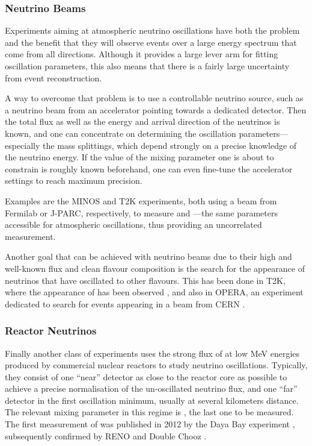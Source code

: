 \subsubsection{Neutrino Beams}

Experiments aiming at atmospheric neutrino oscillations have both the problem
and the benefit that they will observe events over a large energy spectrum that
come from all directions. Although it provides a large lever arm for fitting
oscillation parameters, this also means that there is a fairly large uncertainty
from event reconstruction.

A way to overcome that problem is to use a controllable neutrino source, such as
a neutrino beam from an accelerator pointing towards a dedicated detector. Then
the total flux as well as the energy and arrival direction of the neutrinos is
known, and one can concentrate on determining the oscillation
parameters---especially the mass splittings, which depend strongly on a precise
knowledge of the neutrino energy. If the value of the mixing parameter one is
about to constrain is roughly known beforehand, one can even fine-tune the
accelerator settings to reach maximum precision.

Examples are the MINOS \cite{MINOSparams} and T2K \cite{T2Kparams} experiments,
both using a \numu beam from Fermilab or J-PARC, respectively, to measure
 and ---the same parameters accessible for atmospheric
oscillations, thus providing an uncorrelated measurement.

Another goal that can be achieved with neutrino beams due to their high and
well-known flux and clean flavour composition is the search for the appearance
of neutrinos that have oscillated to other flavours. This has been done in T2K,
where the appearance of \nue has been observed \cite{T2Kapp}, and also in
OPERA, an experiment dedicated to search for \nutau events appearing in a \numu
beam from CERN \cite{OPERAapp}.

\subsubsection{Reactor Neutrinos}

Finally another class of experiments uses the strong flux of \nuebar at low MeV
energies produced by commercial nuclear reactors to study neutrino
oscillations. Typically, they consist of one ``near'' detector as close to the
reactor core as possible to achieve a precise normalisation of the
un-oscillated neutrino flux, and one ``far'' detector in the first oscillation
minimum, usually at several kilometers distance.
The relevant mixing parameter in this regime is , the last one to be
measured. The first measurement of  was published in 2012 by the Daya
Bay experiment \cite{DayaBay}, subsequently confirmed by RENO and Double Chooz
\cite{RENO, DoubleChooz}.

